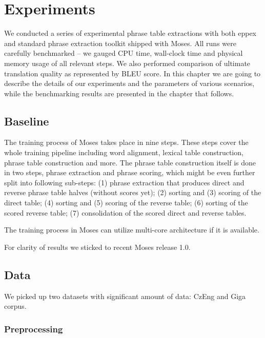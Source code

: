 
\chapter{Experiments}
\label{chap:experiments}

We conducted a series of experimental phrase table extractions with both eppex and
standard phrase extraction toolkit shipped with Moses.
All runs were carefully benchmarked -- we gauged CPU time, wall-clock time and
physical memory usage of all relevant steps.
We also performed comparison of ultimate translation quality as represented by BLEU score.
In this chapter we are going to describe the details of our experiments and
the parameters of various scenarios,
while the benchmarking results are presented in the chapter that follows.

\section{Baseline}

The training process of Moses takes place in nine steps.
These steps cover the whole training pipeline including word alignment, lexical table construction,
phrase table construction and more. The phrase table construction itself is done in two steps,
phrase extraction and phrase scoring, which might be even further split into following
sub-steps: (1) phrase extraction that produces direct and reverse phrase table halves
(without scores yet); (2) sorting and (3) scoring of the direct table; (4)
sorting and (5) scoring of the reverse table; (6) sorting of the scored
reverse table; (7) consolidation of the scored direct and reverse tables.

The training process in Moses can utilize multi-core architecture if it is available.

For clarity of results we sticked to recent Moses release 1.0.

\section{Data}

We picked up two datasets with significant amount of data: CzEng and Giga corpus.

\subsection{Preprocessing}


